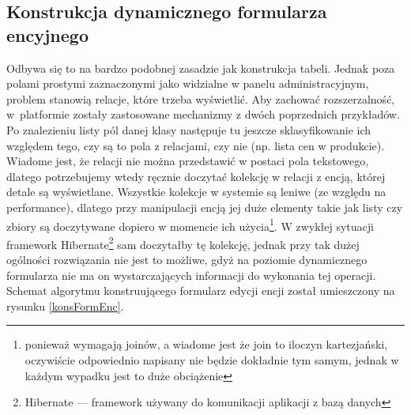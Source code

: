 \newpage
\subsection{Konstrukcja dynamicznego formularza encyjnego} \label{s_konDynForm}
Odbywa się to na bardzo podobnej zasadzie jak konstrukcja tabeli. Jednak poza polami prostymi zaznaczonymi jako widzialne w panelu administracyjnym, problem stanowią relacje, które trzeba wyświetlić. Aby zachować rozszerzalność, w platformie zostały zastosowane mechanizmy z dwóch poprzednich przykładów. Po znalezieniu listy pól danej klasy następuje tu jeszcze sklasyfikowanie ich względem tego, czy są to pola z relacjami, czy nie (np. lista cen w produkcie). Wiadome jest, że relacji nie można przedstawić w postaci pola tekstowego, dlatego potrzebujemy wtedy ręcznie doczytać kolekcję w relacji z encją, której detale są wyświetlane. Wszystkie kolekcje w systemie są leniwe (ze względu na performance), dlatego przy manipulacji encją jej duże elementy takie jak listy czy zbiory są doczytywane dopiero w momencie ich użycia\footnote{ponieważ wymagają joinów, a wiadome jest że join to iloczyn kartezjański, oczywiście odpowiednio napisany nie będzie dokładnie tym samym, jednak w każdym wypadku jest to duże obciążenie}. W zwykłej sytuacji framework Hibernate\footnote{Hibernate — framework używany do komunikacji aplikacji z bazą danych} sam doczytałby tę kolekcję, jednak przy tak dużej ogólności rozwiązania nie jest to możliwe, gdyż na poziomie dynamicznego formularza nie ma on wystarczających informacji do wykonania tej operacji. Schemat algorytmu konstruującego formularz edycji encji został umieszczony na rysunku \ref{konsFormEnc}.
\newpage
